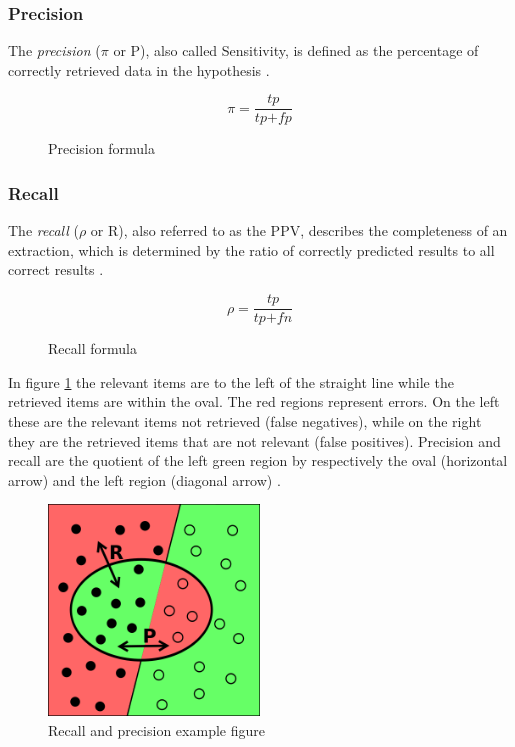 \newpage
\subsubsection{Precision}
The \textit{precision} (\ensuremath{\pi} or P), also called Sensitivity, is defined as the percentage of correctly retrieved data in the hypothesis \cite{Carstensen:2010}. 

\begin{figure}[H]
\begin{displaymath}
	\pi = \frac{\textit{tp}}{\textit{tp} + \textit{fp}}
\end{displaymath}
\caption{Precision formula}
\end{figure}

\subsubsection{Recall}
The \textit{recall} (\ensuremath{\rho} or R), also referred to as the \gls{PPV}, describes the completeness of an extraction, which is determined by the ratio of correctly predicted results to all correct results \cite{Carstensen:2010}.

\begin{figure}[H]
\begin{displaymath}
	\rho = \frac{\textit{tp}}{\textit{tp} + \textit{fn}}
\end{displaymath}
\caption{Recall formula}
\end{figure}

In figure \ref{fig:recall-precision} the relevant items are to the left of the straight line while the retrieved items are within the oval. The red regions represent errors. On the left these are the relevant items not retrieved (false negatives), while on the right they are the retrieved items that are not relevant (false positives). Precision and recall are the quotient of the left green region by respectively the oval (horizontal arrow) and the left region (diagonal arrow) \cite{Wikipedia:Precision_and_recall}.

\begin{figure}[H]
\centering
\includegraphics[width=0.5\textwidth]{recall-precision.png}
\caption{Recall and precision example figure \cite{Wikipedia:Precision_and_recall}}
\label{fig:recall-precision}
\end{figure}

